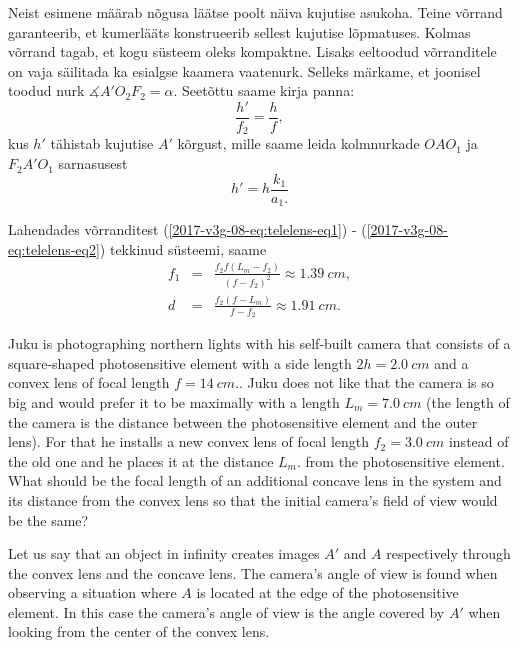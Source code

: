 {\noindent Neist esimene määrab nõgusa läätse poolt näiva kujutise asukoha.
Teine võrrand garanteerib, et kumerlääts konstrueerib sellest kujutise
lõpmatuses. Kolmas võrrand tagab, et kogu süsteem oleks kompaktne.
Lisaks eeltoodud võrranditele on vaja säilitada ka esialgse kaamera
vaatenurk. Selleks märkame, et joonisel toodud nurk $\measuredangle A'O_{2}F_{2}=\alpha.$
Seetõttu saame kirja panna:
\begin{equation}
\frac{h'}{f_{2}}=\frac{h}{f},
\end{equation}
\noindent kus $h'$ tähistab kujutise $A'$ kõrgust, mille saame leida
kolmnurkade $OAO_{1}$ ja $F_{2}A'O_{1}$ sarnasusest
\begin{equation}
h'=h\frac{k_{1}}{a_{1}.}\label{2017-v3g-08-eq:telelens-eq2}
\end{equation}

Lahendades võrranditest (\ref{2017-v3g-08-eq:telelens-eq1}) - (\ref{2017-v3g-08-eq:telelens-eq2})
tekkinud süsteemi, saame
\begin{eqnarray*}
f_{1} & = & \frac{f_{2}f(L_{m}-f_{2})}{\left(f-f_{2}\right)^{2}}\approx\SI{1.39}{cm},\\
d & = & \frac{f_{2}(f-L_{m})}{f-f_{2}}\approx\SI{1.91}{cm}.
\end{eqnarray*}
\fi


\ifEngStatement
Juku is photographing northern lights with his self-built camera that consists of a square-shaped photosensitive element with a side length $2h=\SI{2.0}{cm}$ and a convex lens of focal length $f=\SI{14}{cm}.$. Juku does not like that the camera is so big and would prefer it to be maximally with a length $L_{m}=\SI{7.0}{cm}$ (the length of the camera is the distance between the photosensitive element and the outer lens). For that he installs a new convex lens of focal length $f_{2}=\SI{3.0}{cm}$ instead of the old one and he places it at the distance $L_{m}.$ from the photosensitive element. What should be the focal length of an additional concave lens in the system and its distance from the convex lens so that the initial camera’s field of view would be the same?
\fi


\ifEngHint
Let us say that an object in infinity creates images $A'$ and $A$ respectively through the convex lens and the concave lens. The camera’s angle of view is found when observing a situation where $A$ is located at the edge of the photosensitive element. In this case the camera’s angle of view is the angle covered by $A'$ when looking from the center of the convex lens.
\fi


}
